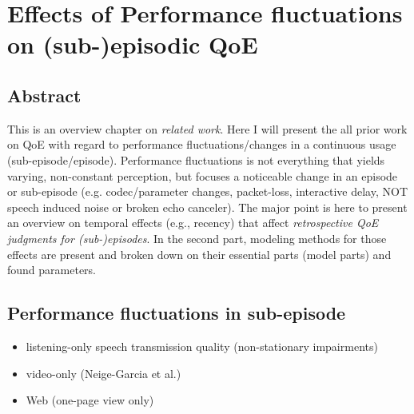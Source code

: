 \chapter{Effects of Performance fluctuations on (sub-)episodic QoE}\label{chap:04}
\section*{Abstract}
This is an overview chapter on \textit{related work}.
Here I will present the all prior work on QoE with regard to performance fluctuations/changes in a continuous usage (sub-episode/episode).
Performance fluctuations is not everything that yields varying, non-constant perception, but focuses a noticeable change in an episode or sub-episode (e.g. codec/parameter changes, packet-loss, interactive delay, NOT speech induced noise or broken echo canceler).
The major point is here to present an overview on temporal effects (e.g., recency) that affect \textit{retrospective QoE judgments for (sub-)episodes}.
In the second part, modeling methods for those effects are present and broken down on their essential parts (model parts) and found parameters.








\section{Performance fluctuations in sub-episode}
\begin{itemize}
\item listening-only speech transmission quality (non-stationary impairments)
\item video-only (Neige-Garcia et al.)
\item Web (one-page view only)
\end{itemize}


